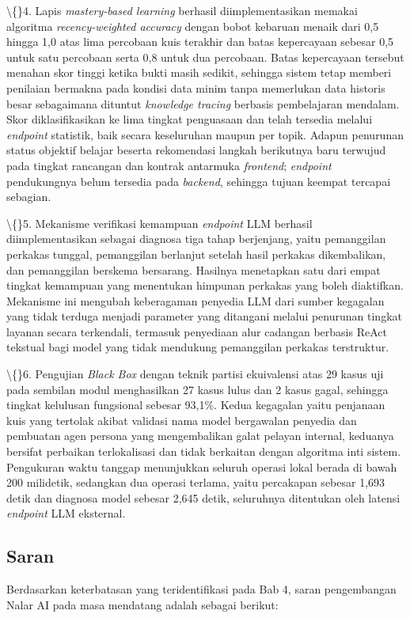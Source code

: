\documentclass[12pt,a4paper]{article}
\begin{document}
\textbackslash\{\}4. Lapis \textit{mastery-based learning} berhasil diimplementasikan memakai algoritma \textit{recency-weighted accuracy} dengan bobot kebaruan menaik dari 0,5 hingga 1,0 atas lima percobaan kuis terakhir dan batas kepercayaan sebesar 0,5 untuk satu percobaan serta 0,8 untuk dua percobaan. Batas kepercayaan tersebut menahan skor tinggi ketika bukti masih sedikit, sehingga sistem tetap memberi penilaian bermakna pada kondisi data minim tanpa memerlukan data historis besar sebagaimana dituntut \textit{knowledge tracing} berbasis pembelajaran mendalam. Skor diklasifikasikan ke lima tingkat penguasaan dan telah tersedia melalui \textit{endpoint} statistik, baik secara keseluruhan maupun per topik. Adapun penurunan status objektif belajar beserta rekomendasi langkah berikutnya baru terwujud pada tingkat rancangan dan kontrak antarmuka \textit{frontend}; \textit{endpoint} pendukungnya belum tersedia pada \textit{backend}, sehingga tujuan keempat tercapai sebagian.

\textbackslash\{\}5. Mekanisme verifikasi kemampuan \textit{endpoint} LLM berhasil diimplementasikan sebagai diagnosa tiga tahap berjenjang, yaitu pemanggilan perkakas tunggal, pemanggilan berlanjut setelah hasil perkakas dikembalikan, dan pemanggilan berskema bersarang. Hasilnya menetapkan satu dari empat tingkat kemampuan yang menentukan himpunan perkakas yang boleh diaktifkan. Mekanisme ini mengubah keberagaman penyedia LLM dari sumber kegagalan yang tidak terduga menjadi parameter yang ditangani melalui penurunan tingkat layanan secara terkendali, termasuk penyediaan alur cadangan berbasis ReAct tekstual bagi model yang tidak mendukung pemanggilan perkakas terstruktur.

\textbackslash\{\}6. Pengujian \textit{Black Box} dengan teknik partisi ekuivalensi atas 29 kasus uji pada sembilan modul menghasilkan 27 kasus lulus dan 2 kasus gagal, sehingga tingkat kelulusan fungsional sebesar 93,1\%. Kedua kegagalan yaitu penjanaan kuis yang tertolak akibat validasi nama model bergawalan penyedia dan pembuatan agen persona yang mengembalikan galat pelayan internal, keduanya bersifat perbaikan terlokalisasi dan tidak berkaitan dengan algoritma inti sistem. Pengukuran waktu tanggap menunjukkan seluruh operasi lokal berada di bawah 200 milidetik, sedangkan dua operasi terlama, yaitu percakapan sebesar 1,693 detik dan diagnosa model sebesar 2,645 detik, seluruhnya ditentukan oleh latensi \textit{endpoint} LLM eksternal.

\subsection*{Saran}
Berdasarkan keterbatasan yang teridentifikasi pada Bab 4, saran pengembangan Nalar AI pada masa mendatang adalah sebagai berikut:
\end{document}
